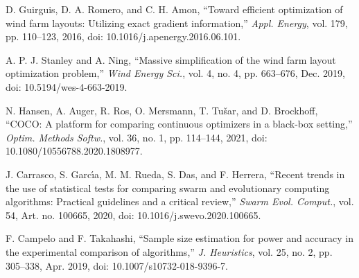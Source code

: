 D. Guirguis, D. A. Romero, and C. H. Amon, ``Toward efficient optimization of wind farm layouts: Utilizing exact gradient information,'' \textit{Appl. Energy}, vol. 179, pp. 110--123, 2016, doi: 10.1016/j.apenergy.2016.06.101.

A. P. J. Stanley and A. Ning, ``Massive simplification of the wind farm layout optimization problem,'' \textit{Wind Energy Sci.}, vol. 4, no. 4, pp. 663--676, Dec. 2019, doi: 10.5194/wes-4-663-2019.

N. Hansen, A. Auger, R. Ros, O. Mersmann, T. Tu\v{s}ar, and D. Brockhoff, ``COCO: A platform for comparing continuous optimizers in a black-box setting,'' \textit{Optim. Methods Softw.}, vol. 36, no. 1, pp. 114--144, 2021, doi: 10.1080/10556788.2020.1808977.

J. Carrasco, S. Garc\'{\i}a, M. M. Rueda, S. Das, and F. Herrera, ``Recent trends in the use of statistical tests for comparing swarm and evolutionary computing algorithms: Practical guidelines and a critical review,'' \textit{Swarm Evol. Comput.}, vol. 54, Art. no. 100665, 2020, doi: 10.1016/j.swevo.2020.100665.

F. Campelo and F. Takahashi, ``Sample size estimation for power and accuracy in the experimental comparison of algorithms,'' \textit{J. Heuristics}, vol. 25, no. 2, pp. 305--338, Apr. 2019, doi: 10.1007/s10732-018-9396-7.


